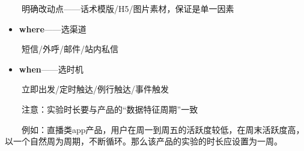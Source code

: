 \documentclass[
  letterpaper,
  DIV=11,
  numbers=noendperiod]{scrreprt}
\providecommand{\tightlist}{%
  \setlength{\itemsep}{0pt}\setlength{\parskip}{0pt}}
\begin{document}
  明确改动点------话术模版/H5/图片素材，保证是单一因素

\begin{itemize}
\tightlist
\item
  \textbf{where}------选渠道
\end{itemize}

  短信/外呼/邮件/站内私信

\begin{itemize}
\tightlist
\item
  \textbf{when}------选时机
\end{itemize}

  立即出发/定时触达/例行触达/事件触发

  注意：实验时长要与产品的``数据特征周期''一致

  例如：直播类app产品，用户在周一到周五的活跃度较低，在周末活跃度高，以一个自然周为周期，不断循环。那么该产品的实验的时长应设置为一周。
\end{document}
